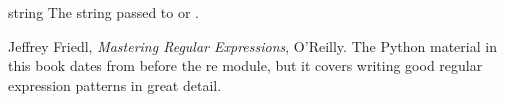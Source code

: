 \begin{datadesc}{string}
The string passed to  or .
\end{datadesc}

\begin{seealso}
\seetext Jeffrey Friedl, \emph{Mastering Regular Expressions},
O'Reilly.  The Python material in this book dates from before the re
module, but it covers writing good regular expression patterns in
great detail. 
\end{seealso}


